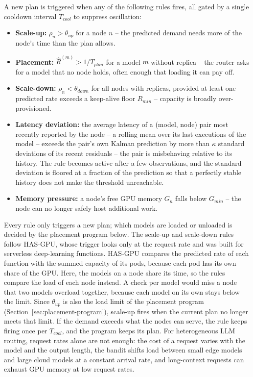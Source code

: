 A new plan is triggered when any of the following rules fires, all gated by a single cooldown interval $T_{cool}$ to suppress oscillation:
\begin{itemize}
    \item \textbf{Scale-up:} $\rho_n > \theta_{up}$ for a node $n$ -- the predicted demand needs more of the node's time than the plan allows.
    \item \textbf{Placement:} $\hat{R}^{(m)} > 1 / T_{plan}$ for a model $m$ without replica -- the router asks for a model that no node holds, often enough that loading it can pay off.
    \item \textbf{Scale-down:} $\rho_n < \theta_{down}$ for all nodes with replicas, provided at least one predicted rate exceeds a keep-alive floor $R_{min}$ -- capacity is broadly over-provisioned.
    \item \textbf{Latency deviation:} the average latency of a (model, node) pair most recently reported by the node -- a rolling mean over its last executions of the model -- exceeds the pair's own Kalman prediction by more than $\kappa$ standard deviations of its recent residuals -- the pair is misbehaving relative to its history. The rule becomes active after a few observations, and the standard deviation is floored at a fraction of the prediction so that a perfectly stable history does not make the threshold unreachable.
    \item \textbf{Memory pressure:} a node's free GPU memory $G_n$ falls below $G_{min}$ -- the node can no longer safely host additional work.
\end{itemize}
Every rule only triggers a new plan; which models are loaded or unloaded is decided by the placement program below.
The scale-up and scale-down rules follow HAS-GPU, whose trigger looks only at the request rate and was built for serverless deep-learning functions.
HAS-GPU compares the predicted rate of each function with the summed capacity of its pods, because each pod has its own share of the GPU.
Here, the models on a node share its time, so the rules compare the load of each node instead.
A check per model would miss a node that two models overload together, because each model on its own stays below the limit.
Since $\theta_{up}$ is also the load limit of the placement program (Section~\ref{sec:placement-program}), scale-up fires when the current plan no longer meets that limit.
If the demand exceeds what the nodes can serve, the rule keeps firing once per $T_{cool}$, and the program keeps its plan.
For heterogeneous LLM routing, request rates alone are not enough: the cost of a request varies with the model and the output length, the bandit shifts load between small edge models and large cloud models at a constant arrival rate, and long-context requests can exhaust GPU memory at low request rates.
